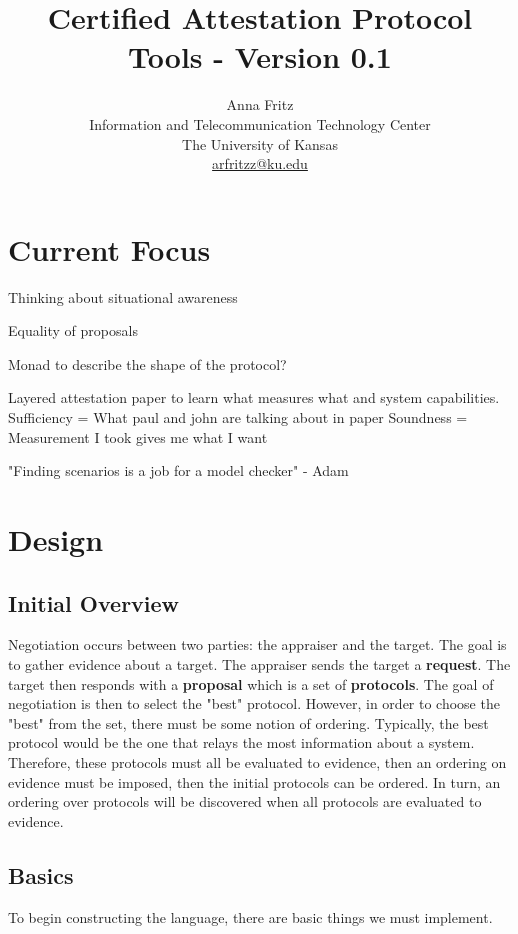 \documentclass[10pt]{report}
\title{Certified Attestation Protocol Tools - Version 0.1}
\author{
  Anna Fritz \\
  Information and Telecommunication Technology Center \\
  The University of Kansas \\
  \url{arfritzz@ku.edu}
}
\begin{document}
\maketitle
\tableofcontents

\chapter{Current Focus}

Thinking about situational awareness

Equality of proposals

Monad to describe the shape of the protocol? 

Layered attestation paper to learn what measures what and system 
capabilities. 
Sufficiency =  What paul and john are talking about in paper
Soundness = Measurement  I took gives me what I want

"Finding scenarios is a job for a model checker" - Adam

\chapter{Design}

\section{Initial Overview}

Negotiation occurs between two parties: the appraiser and the target.
The goal is to gather evidence about a target. The appraiser sends the
target a \textbf{request}. The target then responds
with a \textbf{proposal} which is a set of \textbf{protocols}. The goal of
negotiation is then to select the "best" protocol. However, in order to
choose the "best" from the set, there must be some notion of ordering.
Typically, the best protocol would be the one that relays the most 
information about a system. Therefore, these protocols must all be evaluated
to evidence, then an ordering on evidence must be imposed, then the initial protocols can be ordered. 
In turn, an ordering over protocols will be discovered when all 
protocols are evaluated to evidence.  

\section{Basics}

To begin constructing the language, there are basic things we must implement. 
\end{document}
